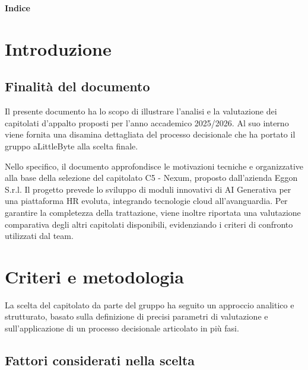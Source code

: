 \documentclass[a4paper,12pt]{article}
\begin{document}
\newpage

\begin{center} 
    {\Large \textbf{Indice}}
\end{center}

\vspace{0.6cm}

\tableofcontents

\newpage

\setcounter{page}{1}

\section{Introduzione}
\subsection{Finalità del documento}

Il presente documento ha lo scopo di illustrare l'analisi e la valutazione dei capitolati d'appalto proposti per l'anno accademico 2025/2026. Al suo interno viene fornita una disamina dettagliata del processo decisionale che ha portato il gruppo aLittleByte alla scelta finale.

Nello specifico, il documento approfondisce le motivazioni tecniche e organizzative alla base della selezione del capitolato C5 - Nexum, proposto dall'azienda Eggon S.r.l. Il progetto prevede lo sviluppo di moduli innovativi di AI Generativa per una piattaforma HR evoluta, integrando tecnologie cloud all'avanguardia. Per garantire la completezza della trattazione, viene inoltre riportata una valutazione comparativa degli altri capitolati disponibili, evidenziando i criteri di confronto utilizzati dal team.

\section{Criteri e metodologia}

La scelta del capitolato da parte del gruppo ha seguito un approccio analitico e strutturato, basato sulla definizione di precisi parametri di valutazione e sull'applicazione di un processo decisionale articolato in più fasi.

\subsection{Fattori considerati nella scelta}
\end{document}
